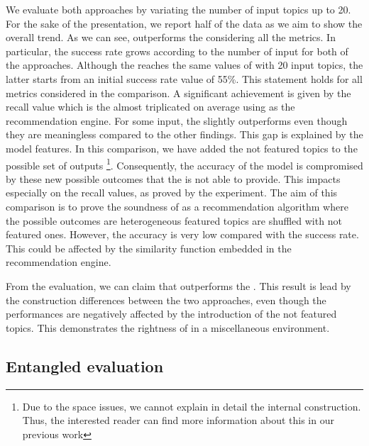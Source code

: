 We evaluate both approaches by variating the number of input topics up to 20. For the sake of the presentation, we report half of the data as we aim to show the overall trend.
As we can see, \CT outperforms the \MNB considering all the metrics. In particular, the success rate grows according to the number of input for both of the approaches. Although the \MNB reaches the same values of \CT with 20 input topics, the latter starts from an initial success rate value of 55\%. This statement holds for all metrics considered in the comparison. A significant achievement is given by the recall value which is the almost triplicated on average using \CT as the recommendation engine. For some input, the \MNB slightly outperforms \CT even though they are meaningless compared to the other findings. 
This gap is explained by the \MNB model features. In this comparison, we have added the not featured topics to the possible set of outputs \footnote{Due to the space issues, we cannot explain in detail the \MNB internal construction. Thus, the interested reader can find more information about this in our previous work}. Consequently, the accuracy of the model is compromised by these new possible outcomes that the \MNB is not able to provide. This impacts especially on the recall values, as proved by the experiment. The aim of this comparison is to prove the soundness of \CT as a recommendation algorithm where the possible outcomes are heterogeneous \ie featured topics are shuffled with not featured ones. However, the accuracy is very low compared with the success rate. This could be affected by the similarity function embedded in the recommendation engine. 


\begin{tcolorbox}[boxrule=0.86pt,left=0.3em, right=0.3em,top=0.1em, bottom=0.05em]
From the evaluation, we can claim that \CT outperforms the \MNB. This result is lead by the construction differences between the two approaches, even though the \MNB performances are negatively affected by the introduction of the not featured topics. This demonstrates the rightness of \CT in a miscellaneous environment. 
\end{tcolorbox}

\subsection{Entangled evaluation} \label{sec:EXP3}
\rqthird

